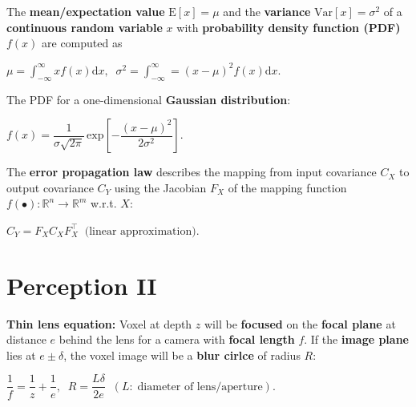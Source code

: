 \documentclass[landscape]{article}
\newcommand{\vmspace}{\vspace{-7pt}}
\newcommand{\vpspace}{\vspace{5pt}}
\newcommand{\vtspace}{\vspace{-10pt}}
\begin{document}
\begin{multicols}{3}
\vpspace

\begin{minipage}{\columnwidth}
  The \textbf{mean/expectation value} $\mathrm{E}[x] = \mu$ and the
  \textbf{variance} $\mathrm{Var}[x] = \sigma^2$ of a \textbf{continuous random
  variable} $x$ with \textbf{probability density function (PDF)} $f(x)$ are
  computed as
  \vmspace
  \begin{center}
    $\mu = \int_{-\infty}^{\infty}xf(x)\mathrm dx,\;\;
    \sigma^2 = \int_{-\infty}^{\infty} = (x - \mu)^2 f(x)
    \mathrm dx.$
  \end{center}
\end{minipage}

\vpspace

\begin{minipage}{\columnwidth}
  The PDF for a one-dimensional \textbf{Gaussian distribution}:
  \vmspace
  \begin{center}
    $f(x) = \dfrac{1}{\sigma \sqrt{2\pi}}\,\mathrm{exp}\left[-\dfrac{(x -
    \mu)^2}{2\sigma^2}\right].$
  \end{center}
\end{minipage}

\vpspace

\begin{minipage}{\columnwidth}
  The \textbf{error propagation law} describes the mapping from input covariance
  $C_X$ to output covariance $C_Y$ using the Jacobian $F_X$ of the mapping
  function $f(\bullet): \mathbb{R}^n \rightarrow \mathbb{R}^m$ w.r.t. $X$:
  \vmspace
  \begin{center}
    $C_Y=F_XC_XF_X^\intercal\;\;\text{(linear approximation)}.$
  \end{center}
\end{minipage}


\vtspace

\section{Perception II}

\vmspace

\begin{minipage}{\columnwidth}
  \textbf{Thin lens equation:} Voxel at depth $z$ will be \textbf{focused} on
  the \textbf{focal plane} at distance $e$ behind the lens for a camera with
  \textbf{focal length} $f$. If the \textbf{image plane} lies at $e \pm \delta$,
  the voxel image will be a \textbf{blur cirlce} of radius $R$:
  \vmspace
  \begin{center}
    $\dfrac{1}{f} = \dfrac{1}{z} + \dfrac{1}{e},\;\; R = \dfrac{L \delta}{2e}
    \;\;
    (L:\;\text{diameter of lens/aperture}).$
  \end{center}
\end{minipage}


\end{multicols}
\end{document}
